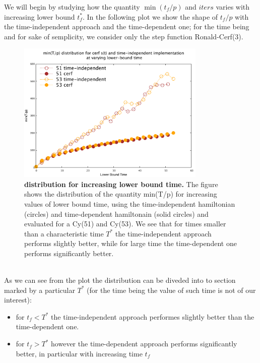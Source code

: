          We will begin by studying how the quantity $\min(t_f/p)$ and $iters$ varies with increasing lower bound $t_f^*$.
         In the following plot we show the shape of $t_f/p$ with the time-independent approach and the time-dependent one; for the time being and for sake of semplicity, we consider only the step function Ronald-Cerf(3).
         \begin{figure}[ht]
         \centering
         \includegraphics[width=90mm]{./figures/min_tp/delta.pdf}
         \caption[$\min(t_f/P)$ distribution for increasing lower bound time.]{\textbf{ distribution for increasing lower bound time. }The figure shows the distribution of the quantity min(T/p) for increasing values of lower bound time, using the time-independent hamiltonian (circles) and time-dependent hamiltonain (solid circles) and evaluated for a Cy(51) and Cy(53). We see that for times smaller than a characteristic time $T^*$ the time-independent approach performs slightly better, while for large time the time-dependent one performs significantly better. }
         \label{fig:delta_increasing_time}
         \end{figure} \\
        As we can see from the plot the distribution can be diveded into to section marked by a particular $T^*$ (for the time being the value of such time is not of our interest):
        \begin{itemize}
            \item for $t_f<T^*$ the time-independent approach performes slightly better than the time-dependent one.
            \item for $t_f>T^*$ however the time-dependent approach performs significantly better, in particular with increasing time $t_f$
        \end{itemize}
